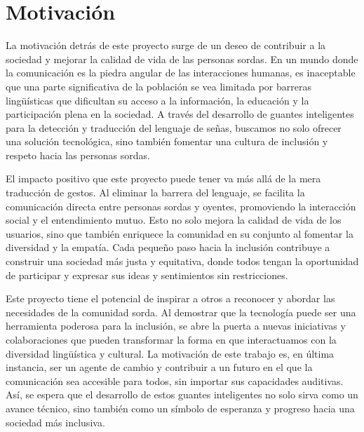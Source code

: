 \section{Motivación}

La motivación detrás de este proyecto surge de un deseo de contribuir a la sociedad y mejorar la calidad de vida de las personas sordas. En un mundo donde la comunicación es la piedra angular de las interacciones humanas, es inaceptable que una parte significativa de la población se vea limitada por barreras lingüísticas que dificultan su acceso a la información, la educación y la participación plena en la sociedad. A través del desarrollo de guantes inteligentes para la detección y traducción del lenguaje de señas, buscamos no solo ofrecer una solución tecnológica, sino también fomentar una cultura de inclusión y respeto hacia las personas sordas.

El impacto positivo que este proyecto puede tener va más allá de la mera traducción de gestos. Al eliminar la barrera del lenguaje, se facilita la comunicación directa entre personas sordas y oyentes, promoviendo la interacción social y el entendimiento mutuo. Esto no solo mejora la calidad de vida de los usuarios, sino que también enriquece la comunidad en su conjunto al fomentar la diversidad y la empatía. Cada pequeño paso hacia la inclusión contribuye a construir una sociedad más justa y equitativa, donde todos tengan la oportunidad de participar y expresar sus ideas y sentimientos sin restricciones.

Este proyecto tiene el potencial de inspirar a otros a reconocer y abordar las necesidades de la comunidad sorda. Al demostrar que la tecnología puede ser una herramienta poderosa para la inclusión, se abre la puerta a nuevas iniciativas y colaboraciones que pueden transformar la forma en que interactuamos con la diversidad lingüística y cultural. La motivación de este trabajo es, en última instancia, ser un agente de cambio y contribuir a un futuro en el que la comunicación sea accesible para todos, sin importar sus capacidades auditivas. Así, se espera que el desarrollo de estos guantes inteligentes no solo sirva como un avance técnico, sino también como un símbolo de esperanza y progreso hacia una sociedad más inclusiva.
